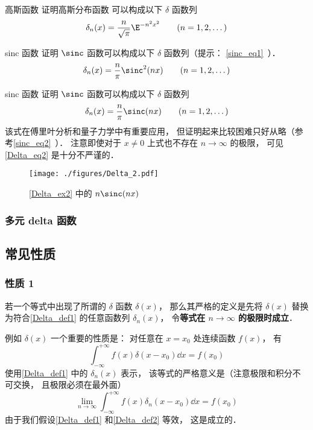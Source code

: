 \begin{exercise}{高斯函数}
证明高斯分布函数 可以构成以下 $\delta$ 函数列
\begin{equation}
\delta_n(x) = \frac{n}{\sqrt{\pi}} \E^{-{n ^2}x^2} \qquad (n = 1, 2, \dots)
\end{equation}
\end{exercise}
\begin{exercise}{sinc 函数}\label{Delta_exe1}
证明 $\sinc$ 函数可以构成以下 $\delta$ 函数列（提示： \autoref{sinc_eq1}~）．
\begin{equation}
\delta_n(x) = \frac{n}{\pi}\sinc^2(n x) \qquad (n = 1, 2, \dots)
\end{equation}
\end{exercise}

\begin{example}{sinc 函数}\label{Delta_ex2}
证明 $\sinc$ 函数可以构成以下 $\delta$ 函数列
\begin{equation}\label{Delta_eq10}
\delta_n(x) = \frac{n}{\pi}\sinc(n x) \qquad (n = 1, 2, \dots)
\end{equation}
该式在傅里叶分析和量子力学中有重要应用\cite{Arfken}， 但证明起来比较困难只好从略（参考\autoref{sinc_eq2}~）． 注意即使对于 $x \ne 0$ 上式也不存在 $n\to\infty$ 的极限， 可见\autoref{Delta_eq2} 是十分不严谨的．
\end{example}
\begin{figure}[ht]
\centering
\texttt{[image: ./figures/Delta\_2.pdf]}
\caption{\autoref{Delta_ex2} 中的 $n\sinc(n x)$} \label{Delta_fig2}
\end{figure}

\subsubsection{多元 delta 函数}

\subsection{常见性质}
\subsubsection{性质 1}
若一个等式中出现了所谓的 $\delta$ 函数 $\delta(x)$， 那么其严格的定义是先将 $\delta(x)$ 替换为符合\autoref{Delta_def1} 的任意函数列 $\delta_n(x)$， 令\textbf{等式在 $n\to\infty$ 的极限时成立}．

例如 $\delta(x)$ 一个重要的性质是： 对任意在 $x = x_0$ 处连续函数 $f(x)$， 有
\begin{equation}\label{Delta_eq7}
\int_{-\infty}^{+\infty} f(x) \delta(x - x_0) \dd{x}= f(x_0)
\end{equation}
使用\autoref{Delta_def1} 中的 $\delta_n(x)$ 表示， 该等式的严格意义是（注意极限和积分不可交换， 且极限必须在最外面）
\begin{equation}\label{Delta_eq11}
\lim_{n\to\infty}\int_{-\infty}^{+\infty} f(x) \delta_n(x - x_0) \dd{x}= f(x_0)
\end{equation}
由于我们假设\autoref{Delta_def1} 和\autoref{Delta_def2} 等效， 这是成立的．


